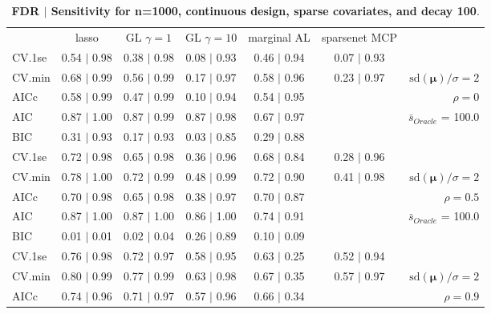 \begin{table}\vspace{-.5cm}
\caption[l]{ {\it }
{ \bf FDR $\boldsymbol{\mid}$ Sensitivity for n=1000, continuous design, sparse covariates, and  decay  100}.}
\vspace{-.5cm}
\footnotesize{}
\begin{center}
\begin{tabular}{l*{5}{c}|r}
 & lasso & GL $\gamma=1$ & GL $\gamma=10$ & marginal AL & sparsenet MCP  & \\
 \cline{1-7}
CV.1se & 0.54 $\mid$ 0.98 & 0.38 $\mid$ 0.98 & 0.08 $\mid$ 0.93 & 0.46 $\mid$ 0.94 & 0.07 $\mid$ 0.93 & \\
CV.min & 0.68 $\mid$ 0.99 & 0.56 $\mid$ 0.99 & 0.17 $\mid$ 0.97 & 0.58 $\mid$ 0.96 & 0.23 $\mid$ 0.97 &  $\mathrm{sd}(\mathbf{\mu})/\sigma=2$ \\
AICc & 0.58 $\mid$ 0.99 & 0.47 $\mid$ 0.99 & 0.10 $\mid$ 0.94 & 0.54 $\mid$ 0.95 & & $\rho=0$ \\
AIC & 0.87 $\mid$ 1.00 & 0.87 $\mid$ 0.99 & 0.87 $\mid$ 0.98 & 0.67 $\mid$ 0.97 & &  \multirow{2}{*}{$\bar{s}_{Oracle}$ = 100.0} \\
BIC & 0.31 $\mid$ 0.93 & 0.17 $\mid$ 0.93 & 0.03 $\mid$ 0.85 & 0.29 $\mid$ 0.88 & &  \\
 \hline 
CV.1se & 0.72 $\mid$ 0.98 & 0.65 $\mid$ 0.98 & 0.36 $\mid$ 0.96 & 0.68 $\mid$ 0.84 & 0.28 $\mid$ 0.96 & \\
CV.min & 0.78 $\mid$ 1.00 & 0.72 $\mid$ 0.99 & 0.48 $\mid$ 0.99 & 0.72 $\mid$ 0.90 & 0.41 $\mid$ 0.98 &  $\mathrm{sd}(\mathbf{\mu})/\sigma=2$ \\
AICc & 0.70 $\mid$ 0.98 & 0.65 $\mid$ 0.98 & 0.38 $\mid$ 0.97 & 0.70 $\mid$ 0.87 & & $\rho=0.5$ \\
AIC & 0.87 $\mid$ 1.00 & 0.87 $\mid$ 1.00 & 0.86 $\mid$ 1.00 & 0.74 $\mid$ 0.91 & &  \multirow{2}{*}{$\bar{s}_{Oracle}$ = 100.0} \\
BIC & 0.01 $\mid$ 0.01 & 0.02 $\mid$ 0.04 & 0.26 $\mid$ 0.89 & 0.10 $\mid$ 0.09 & &  \\
 \hline 
CV.1se & 0.76 $\mid$ 0.98 & 0.72 $\mid$ 0.97 & 0.58 $\mid$ 0.95 & 0.63 $\mid$ 0.25 & 0.52 $\mid$ 0.94 & \\
CV.min & 0.80 $\mid$ 0.99 & 0.77 $\mid$ 0.99 & 0.63 $\mid$ 0.98 & 0.67 $\mid$ 0.35 & 0.57 $\mid$ 0.97 &  $\mathrm{sd}(\mathbf{\mu})/\sigma=2$ \\
AICc & 0.74 $\mid$ 0.96 & 0.71 $\mid$ 0.97 & 0.57 $\mid$ 0.96 & 0.66 $\mid$ 0.34 & & $\rho=0.9$ \\

\end{tabular}
\end{center}
\end{table}
